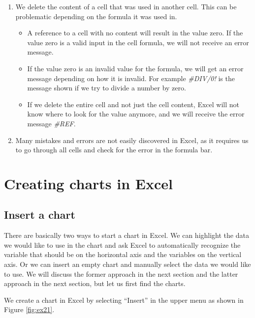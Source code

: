 \documentclass[]{book}
\begin{document}
\begin{enumerate}
\def\labelenumi{\arabic{enumi}.}
\setcounter{enumi}{3}
\item
  We delete the content of a cell that was used in another cell. This can be problematic depending on the formula it was used in.

  \begin{itemize}
  \item
    A reference to a cell with no content will result in the value zero. If the value zero is a valid input in the cell formula, we will not receive an error message.
  \item
    If the value zero is an invalid value for the formula, we will get an error message depending on how it is invalid. For example \emph{\#DIV/0!} is the message shown if we try to divide a number by zero.
  \item
    If we delete the entire cell and not just the cell content, Excel will not know where to look for the value anymore, and we will receive the error message \emph{\#REF}.
  \end{itemize}
\item
  Many mistakes and errors are not easily discovered in Excel, as it requires us to go through all cells and check for the error in the formula bar.
\end{enumerate}

\hypertarget{creating-charts-in-excel}{%
\section{Creating charts in Excel}\label{creating-charts-in-excel}}

\hypertarget{insert-a-chart}{%
\subsection{Insert a chart}\label{insert-a-chart}}

There are basically two ways to start a chart in Excel. We can highlight the data we would like to use in the chart and ask Excel to automatically recognize the variable that should be on the horizontal axis and the variables on the vertical axis. Or we can insert an empty chart and manually select the data we would like to use. We will discuss the former approach in the next section and the latter approach in the next section, but let us first find the charts.

We create a chart in Excel by selecting ``Insert'' in the upper menu as shown in Figure \ref{fig:ex21}.
\end{document}

